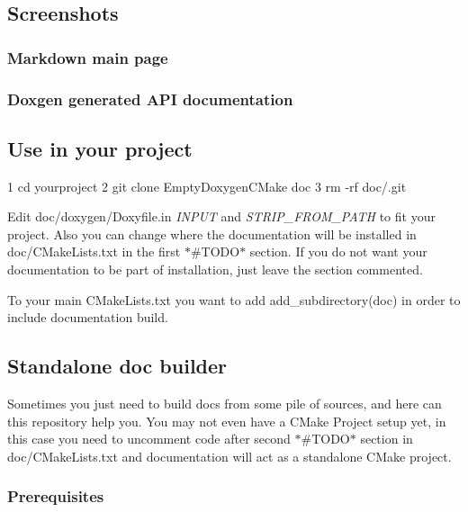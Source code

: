 \subsection*{Screenshots}

\subsubsection*{Markdown main page}



\subsubsection*{Doxgen generated A\+PI documentation}



\subsection*{Use in your project}


\begin{DoxyCode}
1 cd yourproject
2 git clone EmptyDoxygenCMake doc
3 rm -rf doc/.git
\end{DoxyCode}


Edit {\ttfamily doc/doxygen/\+Doxyfile.\+in} {\itshape I\+N\+P\+UT} and {\itshape S\+T\+R\+I\+P\+\_\+\+F\+R\+O\+M\+\_\+\+P\+A\+TH} to fit your project. Also you can change where the documentation will be installed in {\ttfamily doc/\+C\+Make\+Lists.\+txt} in the first $\ast$\#\+T\+O\+DO$\ast$ section. If you do not want your documentation to be part of installation, just leave the section commented.

To your main C\+Make\+Lists.\+txt you want to add {\ttfamily add\+\_\+subdirectory(doc)} in order to include documentation build.

\subsection*{Standalone doc builder}

Sometimes you just need to build docs from some pile of sources, and here can this repository help you. You may not even have a C\+Make Project setup yet, in this case you need to uncomment code after second $\ast$\#\+T\+O\+DO$\ast$ section in {\ttfamily doc/\+C\+Make\+Lists.\+txt} and documentation will act as a standalone C\+Make project.

\subsubsection*{Prerequisites}



